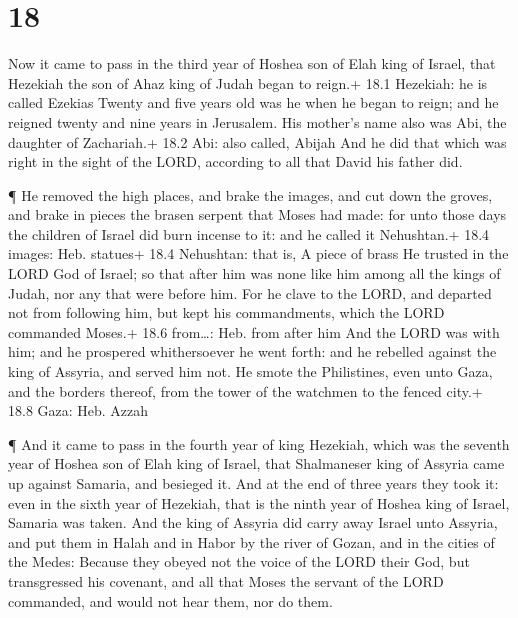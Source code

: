 \hypertarget{section-17}{%
\section{18}\label{section-17}}

 Now it came to pass in the third year of Hoshea son of Elah
king of Israel, that Hezekiah the son of Ahaz king of Judah began to
reign.+ 18.1 Hezekiah: he is called Ezekias  Twenty and five
years old was he when he began to reign; and he reigned twenty and nine
years in Jerusalem. His mother's name also was Abi, the daughter of
Zachariah.+ 18.2 Abi: also called, Abijah  And he did that
which was right in the sight of the LORD, according to all that David
his father did.

 ¶ He removed the high places, and brake the images, and cut
down the groves, and brake in pieces the brasen serpent that Moses had
made: for unto those days the children of Israel did burn incense to it:
and he called it Nehushtan.+ 18.4 images: Heb. statues+ 18.4 Nehushtan:
that is, A piece of brass  He trusted in the LORD God of
Israel; so that after him was none like him among all the kings of
Judah, nor any that were before him.  For he clave to the
LORD, and departed not from following him, but kept his commandments,
which the LORD commanded Moses.+ 18.6 from\ldots: Heb. from after him
 And the LORD was with him; and he prospered whithersoever
he went forth: and he rebelled against the king of Assyria, and served
him not.  He smote the Philistines, even unto Gaza, and the
borders thereof, from the tower of the watchmen to the fenced city.+
18.8 Gaza: Heb. Azzah

 ¶ And it came to pass in the fourth year of king Hezekiah,
which was the seventh year of Hoshea son of Elah king of Israel, that
Shalmaneser king of Assyria came up against Samaria, and besieged it.
 And at the end of three years they took it: even in the
sixth year of Hezekiah, that is the ninth year of Hoshea king of Israel,
Samaria was taken.  And the king of Assyria did carry away
Israel unto Assyria, and put them in Halah and in Habor by the river of
Gozan, and in the cities of the Medes:  Because they obeyed
not the voice of the LORD their God, but transgressed his covenant, and
all that Moses the servant of the LORD commanded, and would not hear
them, nor do them.

